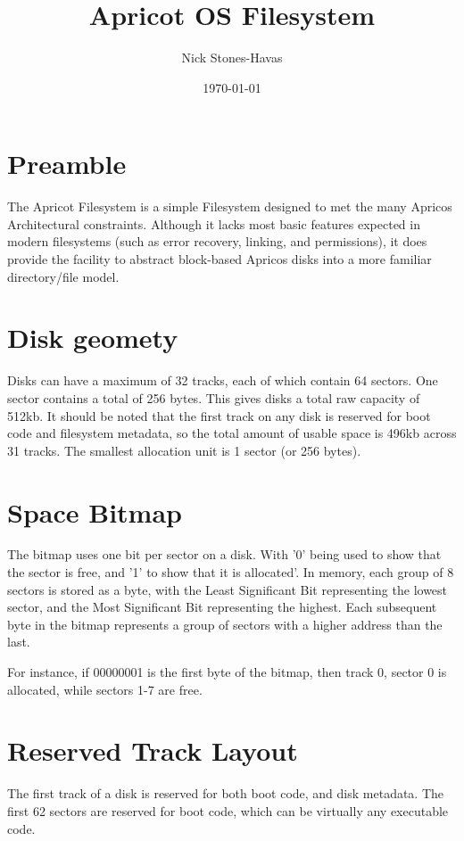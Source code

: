 \documentclass{article}
\title{Apricot OS Filesystem}
\author{Nick Stones-Havas}
\date{\today}
\begin{document}
\maketitle
\thispagestyle{fancy}
\section{Preamble}
The Apricot Filesystem is a simple Filesystem designed to met the many Apricos Architectural constraints. Although it lacks most basic features expected in modern filesystems (such as error recovery, linking, and permissions), it does provide the facility to abstract block-based Apricos disks into a
more familiar directory/file model.

\section{Disk geomety}

Disks can have a maximum of 32 tracks, each of which contain 64 sectors. One sector contains a total of 256 bytes.
This gives disks a total raw capacity of 512kb. It should be noted that the first track on any disk is reserved for boot code
and filesystem metadata, so the total amount of usable space is 496kb across 31 tracks.
The smallest allocation unit is 1 sector (or 256 bytes).

\section{Space Bitmap}

The bitmap uses one bit per sector on a disk. With '0' being used to show that the sector is free, and '1' to show that it is allocated'.
In memory, each group of 8 sectors is stored as a byte, with the Least Significant Bit representing the lowest sector,
and the Most Significant Bit representing the highest. Each subsequent byte in the bitmap represents a group of sectors
with a higher address than the last.

For instance, if 00000001 is the first byte of the bitmap, then track 0, sector 0 is allocated, while sectors 1-7 are free.

\section{Reserved Track Layout}

The first track of a disk is reserved for both boot code, and disk metadata. The first 62 sectors are reserved for boot code, which can be virtually
any executable code.
\end{document}
